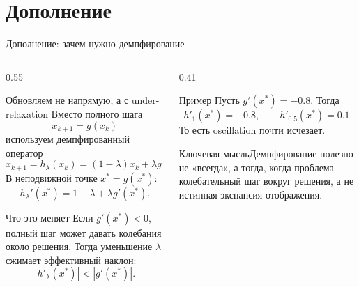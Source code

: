 \documentclass[aspectratio=169,10pt]{beamer}
\newcommand{\keybox}[1]{\begin{block}{Ключевая мысль}#1\end{block}}
\begin{document}
\appendix
\section{Дополнение}

\begin{frame}{Дополнение: зачем нужно демпфирование}
  \small
  \begin{columns}[T,onlytextwidth]
    \begin{column}{0.55\textwidth}
      \begin{block}{Обновляем не напрямую, а с under-relaxation}
        \scriptsize
        Вместо полного шага
        \[
          x_{k+1}=g(x_k)
        \]
        используем демпфированный оператор
        \[
          x_{k+1}=h_\lambda(x_k)
          =(1-\lambda)x_k+\lambda g(x_k),
          \qquad 0<\lambda\le 1.
        \]
        В неподвижной точке $x^*=g(x^*)$:
        \[
          h_\lambda'(x^*)
          =1-\lambda+\lambda g'(x^*).
        \]
      \end{block}
      \begin{block}{Что это меняет}
        \scriptsize
        Если $g'(x^*)<0$, полный шаг может давать
        колебания около решения. Тогда уменьшение $\lambda$
        сжимает эффективный наклон:
        \[
          |h'_\lambda(x^*)| < |g'(x^*)|.
        \]
      \end{block}
    \end{column}
    \begin{column}{0.41\textwidth}
      \begin{block}{Пример}
        \scriptsize
        Пусть $g'(x^*)=-0.8$.
        Тогда
        \[
          h'_{1}(x^*)=-0.8,
          \qquad
          h'_{0.5}(x^*)=0.1.
        \]
        То есть oscillation почти исчезает.
      \end{block}
      \keybox{\scriptsize Демпфирование полезно не «всегда», а тогда, когда проблема — колебательный шаг вокруг решения, а не истинная экспансия отображения.}
    \end{column}
  \end{columns}
\end{frame}
\end{document}

